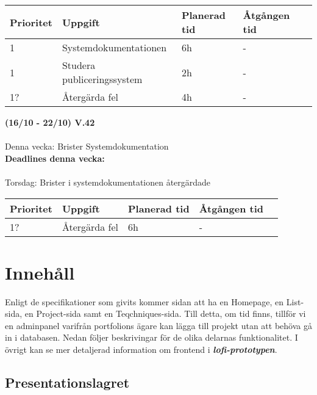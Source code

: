 \documentclass{TDP003mall}
\begin{document}
\begin{table}[]
\begin{tabular}{|l|l|l|l|l|}
\hline
 Prioritet & Uppgift                    & Planerad tid & Åtgången tid \\ \hline
 1         & Systemdokumentationen  & 6h          & -          \\ \hline
 1         & Studera publiceringssystem & 2h           & -       \\ \hline
 1?        & Återgärda fel              & 4h            & -       \\ \hline
\end{tabular}
\end{table}

\hrulefill

\textbf{(16/10 - 22/10) V.42}\\\\
Denna vecka: Brister Systemdokumentation\\

\textbf{Deadlines denna vecka: }\\\\
Torsdag: Brister i systemdokumentationen återgärdade


\begin{table}[]
\begin{tabular}{|l|l|l|l|l|}
\hline
 Prioritet & Uppgift                    & Planerad tid & Åtgången tid \\ \hline
 1?         & Återgärda fel & 6h          & -          \\ \hline

\end{tabular}
\end{table}

\hrulefill

\section{Innehåll}
Enligt de specifikationer som givits kommer sidan att ha en Homepage, en List-sida, 
en Project-sida samt en Teqchniques-sida. Till detta, om tid finns, tillför vi en
adminpanel varifrån portfolions ägare kan lägga till projekt utan att behöva gå in i
databasen. Nedan följer beskrivingar för de olika delarnas funktionalitet. I övrigt kan
se mer detaljerad information om frontend i \textbf{\textit{lofi-prototypen}}.

\subsection{Presentationslagret} 
\end{document}
